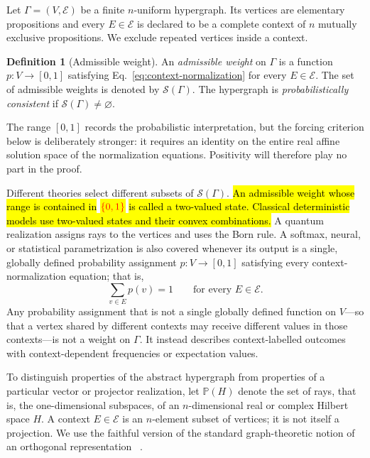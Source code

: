 \documentclass[
  twocolumn,
  aps,
  pra,
  floatfix,
  amsmath,amssymb,
  longbibliography
]{revtex4-2}
\theoremstyle{definition}
\newtheorem{definition}[theorem]{Definition}
\theoremstyle{remark}
\newcommand{\E}{\mathcal E}
\newcommand{\Pc}{\mathbb P}
\newcommand{\corr}[1]{{\color{red}\hl{#1}}}
\newcommand{\corrmath}[1]{\begingroup\setlength{\fboxsep}{1pt}\colorbox{yellow}{\ensuremath{\color{red}#1}}\endgroup}
\begin{document}
Let $\Gamma=(V,\E)$ be a finite $n$-uniform hypergraph.  Its vertices are
elementary propositions and every $E\in\E$ is declared to be a complete
context of $n$ mutually exclusive propositions.  We exclude repeated
vertices inside a context.

\begin{definition}[Admissible weight]
An \emph{admissible weight} on $\Gamma$ is a function
$p:V\to[0,1]$ satisfying Eq.~\eqref{eq:context-normalization} for every
$E\in\E$.  The set of admissible weights is denoted by $\mathcal S(\Gamma)$.
The hypergraph is \emph{probabilistically consistent} if
$\mathcal S(\Gamma)\ne\varnothing$.
\end{definition}

The range $[0,1]$ records the probabilistic interpretation, but the forcing
criterion below is deliberately stronger: it requires an identity on the
entire real affine solution space of the normalization equations.  Positivity
will therefore play no part in the proof.

Different theories select different subsets of $\mathcal S(\Gamma)$.
\corr{An admissible weight whose range is contained in} \corrmath{\{0,1\}}
\corr{is called a two-valued state.  Classical deterministic models use
two-valued states and their convex combinations.}  A quantum realization assigns rays to the vertices and uses
the Born rule. A softmax, neural, or statistical parametrization is also covered whenever
its output is a single, globally defined probability assignment
$p:V\to[0,1]$ satisfying every context-normalization equation; that is,
\[
 \sum_{v\in E}p(v)=1
 \qquad\text{for every }E\in\E.
\]
Any probability assignment that is not a single globally defined function
on $V$---so that a vertex shared by different contexts may receive
different values in those contexts---is not a weight on $\Gamma$.  It
instead describes context-labelled outcomes with context-dependent
frequencies or expectation values.

To distinguish properties of the abstract hypergraph from properties of a
particular vector or projector realization, let $\Pc(H)$ denote the set of
rays, that is, the one-dimensional subspaces, of an $n$-dimensional real or
complex Hilbert space $H$.  A context $E\in\E$ is an $n$-element subset of
vertices; it is not itself a projection.  We use the faithful version of the
standard graph-theoretic notion of an orthogonal representation
~\cite{lovasz-79,lovasz-89,Portillo-2015}.
\end{document}
